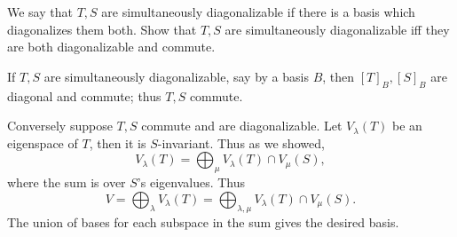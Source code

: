    We say that $T,S$ are {\emphcolor simultaneously diagonalizable} if there is a basis which diagonalizes them both.
    Show that $T,S$ are simultaneously diagonalizable iff they are both diagonalizable and commute.

\eprob

If $T,S$ are simultaneously diagonalizable, say by a basis $B$, then $[T]_B,[S]_B$ are diagonal and commute; thus $T,S$ commute.

Conversely suppose $T,S$ commute and are diagonalizable.
Let $V_\lambda(T)$ be an eigenspace of $T$, then it is $S$-invariant.
Thus as we showed,
$$ V_\lambda(T) = \bigoplus_\mu V_\lambda(T)\cap V_\mu(S) , $$
where the sum is over $S$'s eigenvalues.
Thus
$$ V = \bigoplus_\lambda V_\lambda(T) = \bigoplus_{\lambda,\mu} V_\lambda(T)\cap V_\mu(S) . $$
The union of bases for each subspace in the sum gives the desired basis.

\bye

